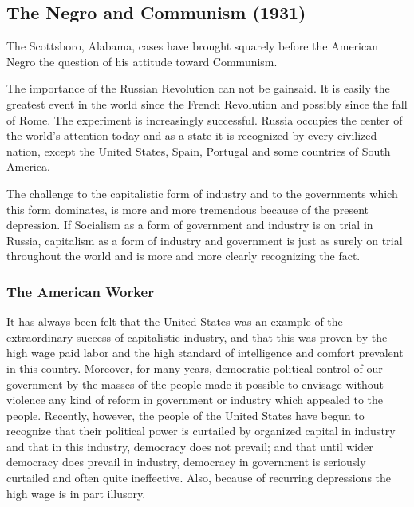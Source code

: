 \documentclass[letterpaper,10pt,english]{jupyterBook}
\begin{document}
\subsection{The Negro and Communism (1931)}
\label{\detokenize{Volumes/38/09/negro_and_communism:the-negro-and-communism-1931}}\label{\detokenize{Volumes/38/09/negro_and_communism::doc}}
\sphinxAtStartPar
The Scottsboro, Alabama, cases have brought squarely before the American Negro the question of his attitude toward Communism.

\sphinxAtStartPar
The importance of the Russian Revolution can not be gainsaid. It is easily the greatest event in the world since the French Revolution and possibly since the fall of Rome. The experiment is increasingly successful. Russia occupies the center of the world’s attention today and as a state it is recognized by every civilized nation, except the United States, Spain, Portugal and some countries of South America.

\sphinxAtStartPar
The challenge to the capitalistic form of industry and to the governments which this form dominates, is more and more tremendous because of the present depression. If Socialism as a form of government and industry is on trial in Russia, capitalism as a form of industry and government is just as surely on trial throughout the world and is more and more clearly recognizing the fact.


\subsubsection{The American Worker}
\label{\detokenize{Volumes/38/09/negro_and_communism:the-american-worker}}
\sphinxAtStartPar
It has always been felt that the United States was an example of the extraordinary success of capitalistic industry, and that this was proven by the high wage paid labor and the high standard of intelligence and comfort prevalent in this country. Moreover, for many years, democratic political control of our government by the masses of the people made it possible to envisage without violence any kind of reform in government or industry which appealed to the people. Recently, however, the people of the United States have begun to recognize that their political power is curtailed by organized capital in industry and that in this industry, democracy does not prevail; and that until wider democracy does prevail in industry, democracy in government is seriously curtailed and often quite ineffective. Also, because of recurring depressions the high wage is in part illusory.
\end{document}
